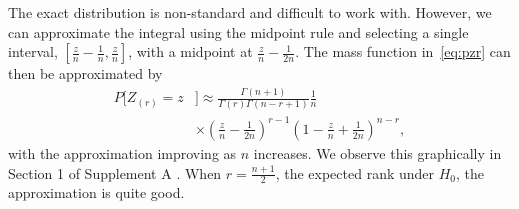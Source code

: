 \documentclass[12pt]{article}
\theoremstyle{plain}
\theoremstyle{remark}
\begin{document}

The exact distribution is non-standard and difficult to work with. However, we can approximate the integral using the midpoint rule and selecting a single interval, $[\frac{z}{n} - \frac{1}{n}, \frac{z}{n}]$, with a midpoint at $\frac{z}{n} - \frac{1}{2n}$. 
The mass function in~\eqref{eq:pzr} can then be approximated by
\begin{align}
	P\bigg[ Z_{(r)} = z &\bigg] \approx \frac{\Gamma(n+1)}{\Gamma(r)\Gamma(n - r + 1)} \frac{1}{n}  \label{eq:pmf} \\
	& \times  \left(\frac{z}{n} - \frac{1}{2n}\right)^{r-1} \left(1-\frac{z}{n} + \frac{1}{2n}\right)^{n-r}, \nonumber
\end{align}
with the approximation improving as $n$ increases. We observe this graphically in Section 1 of Supplement A \citep{DRTSup2024A}. When $r = \frac{n+1}{2}$, the expected rank under $H_0$, the approximation is quite good.

\end{document}

